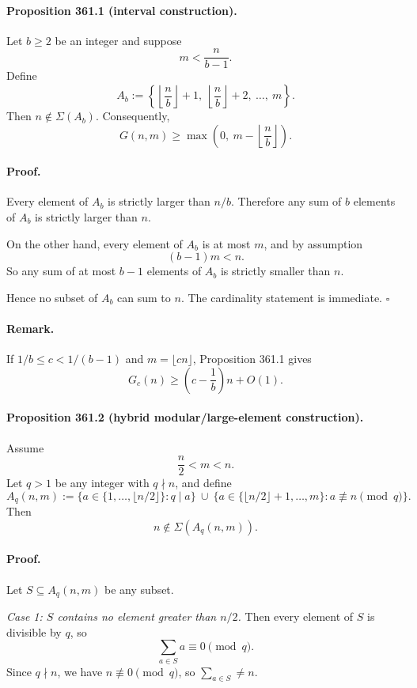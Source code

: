 \paragraph{Proposition 361.1 (interval construction).}
Let $b\ge 2$ be an integer and suppose
\[
m<\frac{n}{b-1}.
\]
Define
\[
A_b:=\left\{\left\lfloor \frac nb\right\rfloor+1,\ \left\lfloor \frac nb\right\rfloor+2,\ \dots,\ m\right\}.
\]
Then $n\notin \Sigma(A_b)$.  Consequently,
\[
G(n,m)\ge \max\!\left(0,\ m-\left\lfloor \frac nb\right\rfloor\right).
\]

\paragraph{Proof.}
Every element of $A_b$ is strictly larger than $n/b$.  Therefore any sum of $b$ elements of $A_b$ is strictly larger than $n$.

On the other hand, every element of $A_b$ is at most $m$, and by assumption
\[
(b-1)m<n.
\]
So any sum of at most $b-1$ elements of $A_b$ is strictly smaller than $n$.

Hence no subset of $A_b$ can sum to $n$.  The cardinality statement is immediate.
\hfill $\square$

\paragraph{Remark.}
If $1/b\le c<1/(b-1)$ and $m=\lfloor cn\rfloor$, Proposition 361.1 gives
\[
G_c(n)\ge \left(c-\frac1b\right)n+O(1).
\]

\paragraph{Proposition 361.2 (hybrid modular/large-element construction).}
Assume
\[
\frac n2 < m < n.
\]
Let $q>1$ be any integer with $q\nmid n$, and define
\[
A_q(n,m):=
\{a\in \{1,\dots,\lfloor n/2\rfloor\}: q\mid a\}
\ \cup\
\{a\in \{\lfloor n/2\rfloor+1,\dots,m\}: a\not\equiv n \pmod q\}.
\]
Then
\[
n\notin \Sigma(A_q(n,m)).
\]

\paragraph{Proof.}
Let $S\subseteq A_q(n,m)$ be any subset.

\smallskip
\noindent
\emph{Case 1: $S$ contains no element greater than $n/2$.}
Then every element of $S$ is divisible by $q$, so
\[
\sum_{a\in S} a \equiv 0 \pmod q.
\]
Since $q\nmid n$, we have $n\not\equiv 0\pmod q$, so $\sum_{a\in S}\neq n$.

